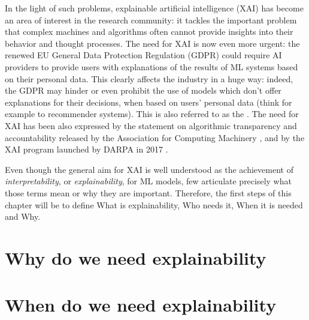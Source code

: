 In the light of such problems, explainable artificial intelligence (XAI) has become an area of interest in the research community: it tackles the important problem that complex machines and algorithms often cannot provide insights into their behavior and thought processes. The need for XAI is now even more urgent: the renewed EU General Data Protection Regulation (GDPR) could require AI providers to provide users with explanations of the results of ML systems based on their personal data. This clearly affects the industry in a huge way: indeed, the GDPR may hinder or even prohibit the use of  models which don't offer explanations for their decisions, when based on users' personal data (think for example to recommender systems). This is also referred to as the . The need for XAI has been also expressed by the statement on algorithmic transparency and accountability released by the Association for Computing Machinery \cite{acm2017transparency}, and by the XAI program launched by DARPA in 2017 \cite{gunning2019xai}.

Even though the general aim for XAI is well understood as the achievement of \textit{interpretability}, or \textit{explainability}, for ML models, few articulate precisely what those terms mean or why they are important. Therefore, the first steps of this chapter will be to define What is explainability, Who needs it, When it is needed and Why.

\section{Why do we need explainability}
\section{When do we need explainability}


